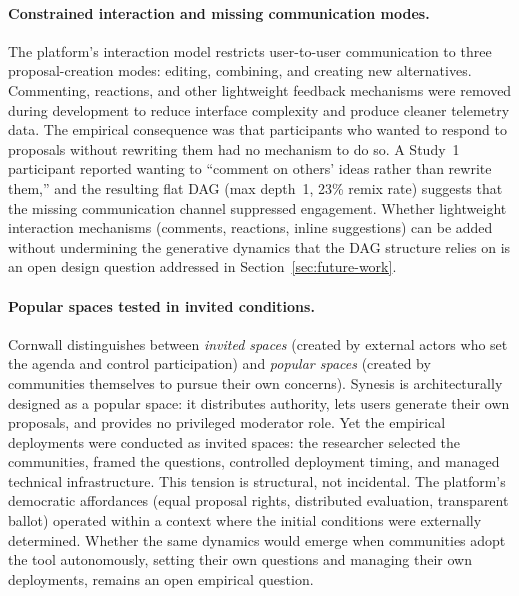 \documentclass[a4paper, 12pt, twoside]{iviathesis}
\begin{document}
\paragraph{Constrained interaction and missing communication modes.}
The platform's interaction model restricts user-to-user communication to three proposal-creation modes: editing, combining, and creating new alternatives. Commenting, reactions, and other lightweight feedback mechanisms were removed during development to reduce interface complexity and produce cleaner telemetry data. The empirical consequence was that participants who wanted to respond to proposals without rewriting them had no mechanism to do so. A Study~1 participant reported wanting to ``comment on others' ideas rather than rewrite them,'' and the resulting flat DAG (max depth~1, 23\% remix rate) suggests that the missing communication channel suppressed engagement. Whether lightweight interaction mechanisms (comments, reactions, inline suggestions) can be added without undermining the generative dynamics that the DAG structure relies on is an open design question addressed in Section~\ref{sec:future-work}.

\paragraph{Popular spaces tested in invited conditions.}
Cornwall \cite{cornwall2004, cornwall2007} distinguishes between \textit{invited spaces} (created by external actors who set the agenda and control participation) and \textit{popular spaces} (created by communities themselves to pursue their own concerns). Synesis is architecturally designed as a popular space: it distributes authority, lets users generate their own proposals, and provides no privileged moderator role. Yet the empirical deployments were conducted as invited spaces: the researcher selected the communities, framed the questions, controlled deployment timing, and managed technical infrastructure. This tension is structural, not incidental. The platform's democratic affordances (equal proposal rights, distributed evaluation, transparent ballot) operated within a context where the initial conditions were externally determined. Whether the same dynamics would emerge when communities adopt the tool autonomously, setting their own questions and managing their own deployments, remains an open empirical question.
\end{document}
